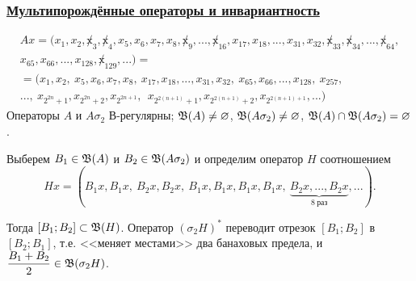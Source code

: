 \begin{frame}\frametitle{\underline{Мультипорождённые операторы и инвариантность}}
	\begin{multline}
		Ax = (x_1, x_2, \not x_3, \not x_4, x_5, x_6, x_7, x_8, \not x_9, ..., \not x_{16}, x_{17}, x_{18}, ..., x_{31}, x_{32}, \not x_{33}, \not x_{34}, ..., \not x_{64},
		\\
		x_{65}, x_{66}, ..., x_{128}, \not x_{129}, ...)=
		\\=
		(x_1, x_2, \ x_5, x_6, x_7, x_8, \ x_{17}, x_{18}, ..., x_{31}, x_{32}, \ x_{65}, x_{66}, ..., x_{128}, \ x_{257},
		\\
		..., \ x_{2^{2n} +1}, x_{2^{2n} +2},  x_{2^{2n+1}}, \ \ x_{2^{2(n+1)} +1},  x_{2^{2(n+1)} +2},  x_{2^{2(n+1)+1}}, ...)
	\end{multline}
	Операторы $A$ и $A\sigma_2$ В-регулярны; $\mathfrak{B}(A) \ne\varnothing$, $\mathfrak{B}(A\sigma_2) \ne\varnothing$,
	$\mathfrak{B}(A) \cap \mathfrak{B}(A\sigma_2) =\varnothing$.

	\vfill

	Выберем $B_1 \in \mathfrak{B} (A)$ и $B_2 \in \mathfrak{B}(A\sigma_2)$ и определим оператор $H$ соотношением
	\begin{equation}
		Hx = (B_1 x, B_1 x, \ B_2 x, B_2 x, \ B_1 x, B_1 x, B_1 x, B_1 x, \ \underbrace{B_2 x, ..., B_2 x}_{8~\mbox{раз}}, ...)
		.
	\end{equation}

	Тогда $[B_1; B_2]\subset \mathfrak{B}(H)$.
	Оператор $(\sigma_2 H)^*$ переводит отрезок $[B_1; B_2]$ в $[B_2; B_1]$,
	т.е. <<меняет местами>> два банаховых предела,
	и $\dfrac{B_1 + B_2}2 \in \mathfrak{B}(\sigma_2 H)$.
\end{frame}

